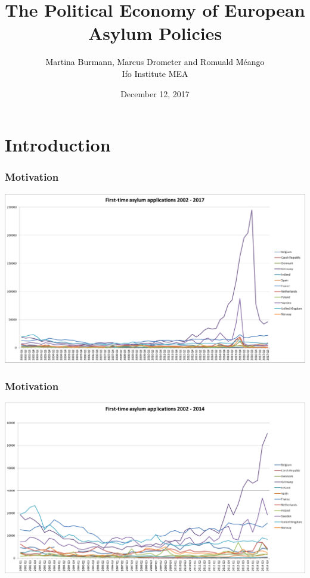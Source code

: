 \documentclass[compress, xcolor = {table,xcdraw}]{beamer}
\title {The Political Economy of European Asylum Policies}
\subtitle{\small\textcolor{black}{Martina Burmann, Marcus Drometer and Romuald M\'eango\\[1ex]
		\scriptsize{\hspace{10ex}Ifo Institute \hspace{29ex} MEA}}}
\institute{ifo Christmas Conference}
\date{December 12, 2017}
\begin{document}

\begin{frame}[plain]
\setlength{\leftmargin}{1cm}
\titlepage 
\end{frame}

\section{Introduction}


\begin{frame}
\frametitle{Motivation}
\begin{center}	
	\includegraphics[width=1\textwidth] {firsttimeapplications02-17.png}	
\end{center}
\end{frame}

\begin{frame}
\frametitle{Motivation}
\begin{center}	
	\includegraphics[width=1\textwidth] {firsttimeapplications02-14.png}	
\end{center}
\end{frame}
\end{document}
